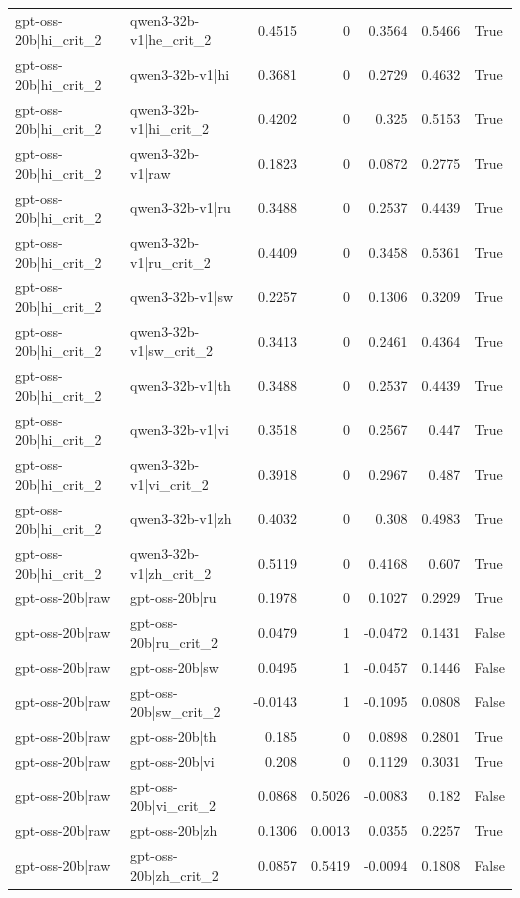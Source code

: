 \begin{table}
\begin{tabular}{l l r r r r l}
gpt-oss-20b|hi_crit_2 & qwen3-32b-v1|he_crit_2 & 0.4515 & 0 & 0.3564 & 0.5466 & True \\
gpt-oss-20b|hi_crit_2 & qwen3-32b-v1|hi & 0.3681 & 0 & 0.2729 & 0.4632 & True \\
gpt-oss-20b|hi_crit_2 & qwen3-32b-v1|hi_crit_2 & 0.4202 & 0 & 0.325 & 0.5153 & True \\
gpt-oss-20b|hi_crit_2 & qwen3-32b-v1|raw & 0.1823 & 0 & 0.0872 & 0.2775 & True \\
gpt-oss-20b|hi_crit_2 & qwen3-32b-v1|ru & 0.3488 & 0 & 0.2537 & 0.4439 & True \\
gpt-oss-20b|hi_crit_2 & qwen3-32b-v1|ru_crit_2 & 0.4409 & 0 & 0.3458 & 0.5361 & True \\
gpt-oss-20b|hi_crit_2 & qwen3-32b-v1|sw & 0.2257 & 0 & 0.1306 & 0.3209 & True \\
gpt-oss-20b|hi_crit_2 & qwen3-32b-v1|sw_crit_2 & 0.3413 & 0 & 0.2461 & 0.4364 & True \\
gpt-oss-20b|hi_crit_2 & qwen3-32b-v1|th & 0.3488 & 0 & 0.2537 & 0.4439 & True \\
gpt-oss-20b|hi_crit_2 & qwen3-32b-v1|vi & 0.3518 & 0 & 0.2567 & 0.447 & True \\
gpt-oss-20b|hi_crit_2 & qwen3-32b-v1|vi_crit_2 & 0.3918 & 0 & 0.2967 & 0.487 & True \\
gpt-oss-20b|hi_crit_2 & qwen3-32b-v1|zh & 0.4032 & 0 & 0.308 & 0.4983 & True \\
gpt-oss-20b|hi_crit_2 & qwen3-32b-v1|zh_crit_2 & 0.5119 & 0 & 0.4168 & 0.607 & True \\
gpt-oss-20b|raw & gpt-oss-20b|ru & 0.1978 & 0 & 0.1027 & 0.2929 & True \\
gpt-oss-20b|raw & gpt-oss-20b|ru_crit_2 & 0.0479 & 1 & -0.0472 & 0.1431 & False \\
gpt-oss-20b|raw & gpt-oss-20b|sw & 0.0495 & 1 & -0.0457 & 0.1446 & False \\
gpt-oss-20b|raw & gpt-oss-20b|sw_crit_2 & -0.0143 & 1 & -0.1095 & 0.0808 & False \\
gpt-oss-20b|raw & gpt-oss-20b|th & 0.185 & 0 & 0.0898 & 0.2801 & True \\
gpt-oss-20b|raw & gpt-oss-20b|vi & 0.208 & 0 & 0.1129 & 0.3031 & True \\
gpt-oss-20b|raw & gpt-oss-20b|vi_crit_2 & 0.0868 & 0.5026 & -0.0083 & 0.182 & False \\
gpt-oss-20b|raw & gpt-oss-20b|zh & 0.1306 & 0.0013 & 0.0355 & 0.2257 & True \\
gpt-oss-20b|raw & gpt-oss-20b|zh_crit_2 & 0.0857 & 0.5419 & -0.0094 & 0.1808 & False \\

\end{tabular}
\end{table}
